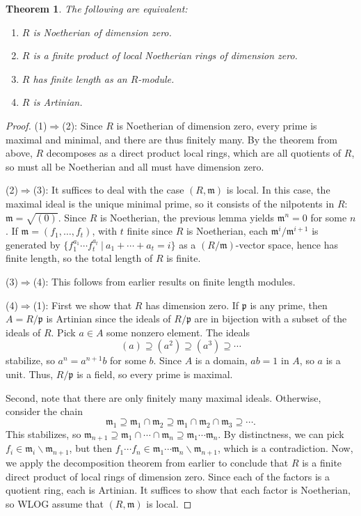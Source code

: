 \documentclass{amsart}[12pt]
\newcommand{\p}{{\mathfrak p}}
\newcommand{\m}{{\mathfrak m}}
\numberwithin{equation}{section}
\theoremstyle{plain} %
\newtheorem{theorem}[equation]{Theorem}
\theoremstyle{definition}
\theoremstyle{remark}
\begin{document}
\begin{theorem} The following are equivalent:
	\begin{enumerate}
		\item $R$ is Noetherian of dimension zero.
		\item $R$ is a finite product of local Noetherian rings of dimension zero.
		\item $R$ has finite length as an $R$-module.
		\item $R$ is Artinian.
	\end{enumerate}
\end{theorem}

\begin{proof}
	(1)$\Rightarrow$(2): Since $R$ is Noetherian of dimension zero, every prime is maximal and minimal, and there are thus finitely many. By the theorem from above, $R$ decomposes as a direct product local rings, which are all quotients of $R$, so must all be Noetherian and all must have dimension zero.
	
	(2)$\Rightarrow$(3): It suffices to deal with the case $(R,\m)$ is local. In this case, the maximal ideal is the unique minimal prime, so it consists of the nilpotents in $R$: $\m=\sqrt{(0)}$. Since $R$ is Noetherian, the previous lemma yields $\m^n=0$ for some $n$. If $\m=(f_1,\dots,f_t)$, with $t$ finite since $R$ is Noetherian, each $\m^i/\m^{i+1}$ is generated by $\{ f_1^{a_1} \cdots f_t^{a_t} \ | \ a_1+\cdots + a_t = i\}$ as a $(R/\m)$-vector space, hence has finite length, so the total length of $R$ is finite.
	
	(3)$\Rightarrow$(4): This follows from earlier results on finite length modules.
	
	(4)$\Rightarrow$(1): First we show that $R$ has dimension zero. If $\p$ is any prime, then $A=R/\p$ is Artinian since the ideals of $R/\p$ are in bijection with a subset of the ideals of $R$. Pick $a\in A$ some nonzero element. The ideals
	\[ (a) \supseteq (a^2) \supseteq (a^3) \supseteq \cdots \]
	stabilize, so $a^n=a^{n+1}b$ for some $b$. Since $A$ is a domain, $ab=1$ in $A$, so $a$ is a unit. Thus, $R/\p$ is a field, so every prime is maximal.
	
	Second, note that there are only finitely many maximal ideals. Otherwise, consider the chain
	\[ \m_1 \supseteq \m_1\cap \m_2 \supseteq \m_1\cap \m_2 \cap \m_3 \supseteq \cdots .\]
	This stabilizes, so $\m_{n+1} \supseteq \m_1 \cap \cdots \cap \m_n  \supseteq \m_1 \cdots \m_n$. By distinctness, we can pick $f_i\in \m_i \smallsetminus \m_{n+1}$, but then $f_1\cdots f_n  \in \m_1 \cdots \m_n \smallsetminus \m_{n+1}$, which is a contradiction. Now, we apply the decomposition theorem from earlier to conclude that $R$ is a finite direct product of local rings of dimension zero. Since each of the factors is a quotient ring, each is Artinian. It suffices to show that each factor is Noetherian, so WLOG assume that $(R,\m)$ is local.
	

\end{proof}
\end{document}
